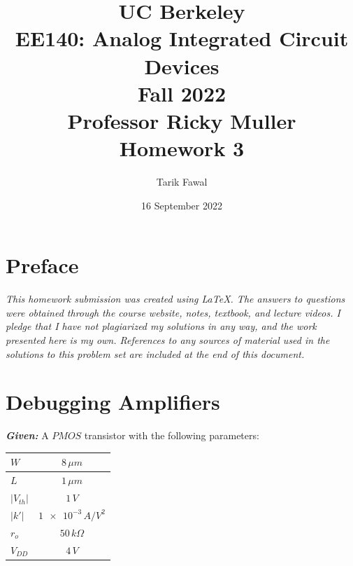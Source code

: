 \documentclass[12pt, fleqn]{article}
\title {
    \normalsize{UC Berkeley}\\
    \large{{EE140: Analog Integrated Circuit Devices\\Fall 2022\\Professor Ricky Muller\\}}
    \vspace{0.5ex}
    \Huge{Homework 3}
    \vspace{0.5ex}
}
\author{Tarik Fawal}
\date{16 September 2022}
\begin{document}
\maketitle
\tableofcontents
\flushbottom
    \section*{Preface}
        \textit{\emph{This homework submission was created using \LaTeX.  The answers to questions were obtained through the course website, notes, textbook, and lecture videos.  I pledge that I have not plagiarized my solutions in any way, and the work presented here is my own.  References to any sources of material used in the solutions to this problem set are included at the end of this document.}}
\newpage
\section{Debugging Amplifiers}
\textbf{\emph{Given: }} A $PMOS$ transistor with the following parameters:

    \begin{table}[H]
    \centering
    \setlength{\tabcolsep}{20pt}
    \renewcommand{\arraystretch}{1.5}
        \begin{tabular}{|l|c|}
            \hline
            $W$ & $8\,\mu m$\\
            \hline
            $L$ & $1\,\mu m$\\
            \hline
            $\left|V_{th}\right|$ & $1\,V$\\
            \hline
            $\left|k'\right|$ & $\num{1e-3}\,A/V^2$\\
            \hline
            $r_o$ & $50\,k\Omega$\\
            \hline
            $V_{DD}$ & $4\,V$\\
            \hline
        \end{tabular}
    \end{table}
\end{document}
